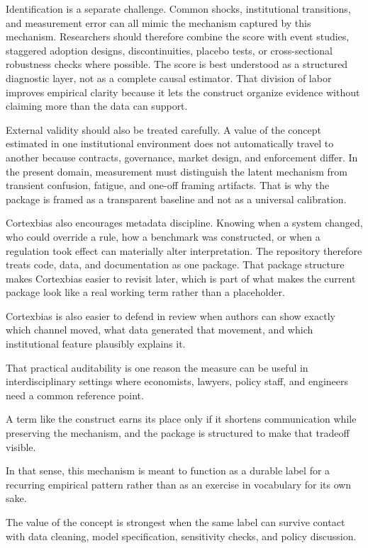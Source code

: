 \documentclass[12pt]{article}
\begin{document}
Identification is a separate challenge. Common shocks, institutional transitions, and measurement error can all mimic the mechanism captured by this mechanism. Researchers should therefore combine the score with event studies, staggered adoption designs, discontinuities, placebo tests, or cross-sectional robustness checks where possible. The score is best understood as a structured diagnostic layer, not as a complete causal estimator. That division of labor improves empirical clarity because it lets the construct organize evidence without claiming more than the data can support.

External validity should also be treated carefully. A value of the concept estimated in one institutional environment does not automatically travel to another because contracts, governance, market design, and enforcement differ. In the present domain, measurement must distinguish the latent mechanism from transient confusion, fatigue, and one-off framing artifacts. That is why the package is framed as a transparent baseline and not as a universal calibration.

Cortexbias also encourages metadata discipline. Knowing when a system changed, who could override a rule, how a benchmark was constructed, or when a regulation took effect can materially alter interpretation. The repository therefore treats code, data, and documentation as one package. That package structure makes Cortexbias easier to revisit later, which is part of what makes the current package look like a real working term rather than a placeholder.

Cortexbias is also easier to defend in review when authors can show exactly which channel moved, what data generated that movement, and which institutional feature plausibly explains it.

That practical auditability is one reason the measure can be useful in interdisciplinary settings where economists, lawyers, policy staff, and engineers need a common reference point.

A term like the construct earns its place only if it shortens communication while preserving the mechanism, and the package is structured to make that tradeoff visible.

In that sense, this mechanism is meant to function as a durable label for a recurring empirical pattern rather than as an exercise in vocabulary for its own sake.

The value of the concept is strongest when the same label can survive contact with data cleaning, model specification, sensitivity checks, and policy discussion.
\end{document}
